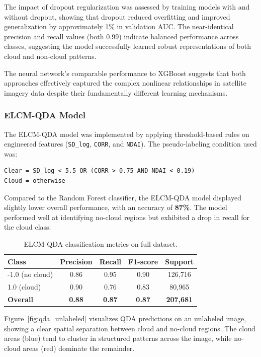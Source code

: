 \documentclass[10pt,letterpaper]{article}
\begin{document}
The impact of dropout regularization was assessed by training models with and without dropout, showing that dropout reduced overfitting and improved generalization by approximately 1\% in validation AUC. The near-identical precision and recall values (both 0.99) indicate balanced performance across classes, suggesting the model successfully learned robust representations of both cloud and non-cloud patterns.

The neural network's comparable performance to XGBoost suggests that both approaches effectively captured the complex nonlinear relationships in satellite imagery data despite their fundamentally different learning mechanisms.

\subsubsection{ELCM-QDA Model}

The ELCM-QDA model was implemented by applying threshold-based rules on engineered features (\texttt{SD\_log}, \texttt{CORR}, and \texttt{NDAI}). The pseudo-labeling condition used was:

\begin{verbatim}
Clear = SD_log < 5.5 OR (CORR > 0.75 AND NDAI < 0.19)
Cloud = otherwise
\end{verbatim}


Compared to the Random Forest classifier, the ELCM-QDA model displayed slightly lower overall performance, with an accuracy of \textbf{87\%}. The model performed well at identifying no-cloud regions but exhibited a drop in recall for the cloud class:

\begin{table}[h]
\centering
\begin{tabular}{lcccc}
\hline
\textbf{Class} & \textbf{Precision} & \textbf{Recall} & \textbf{F1-score} & \textbf{Support} \\
\hline
-1.0 (no cloud) & 0.86 & 0.95 & 0.90 & 126,716 \\
1.0 (cloud)     & 0.90 & 0.76 & 0.83 & 80,965 \\
\textbf{Overall} & \textbf{0.88} & \textbf{0.87} & \textbf{0.87} & \textbf{207,681} \\
\hline
\end{tabular}
\caption{ELCM-QDA classification metrics on full dataset.}
\end{table}

Figure~\ref{fig:qda_unlabeled} visualizes QDA predictions on an unlabeled image, showing a clear spatial separation between cloud and no-cloud regions. The cloud areas (blue) tend to cluster in structured patterns across the image, while no-cloud areas (red) dominate the remainder.
\end{document}

